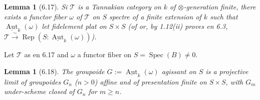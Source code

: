 \documentclass[12pt,a4paper]{article}
\theoremstyle{plain}
\newtheorem{lemma}[theorem]{Lemma}
\theoremstyle{definition}
\DeclareMathOperator{\Spec}{Spec}
\DeclareMathOperator{\Aut}{Aut}
\DeclareMathOperator{\Rep}{Rep}
\begin{document}
\begin{lemma}[6.17]
Si $\mathcal{T}$ is a Tannakian category on $k$ of $\otimes$-generation finite, there exists a functor fiber $\omega$ of $\mathcal{T}$ on $S$ spectre of a finite extension of $k$ such that $\underline{\Aut}_k(\omega)$ let fidelement plat on $S \times S$ (of or, by 1.12(ii) proves en 6.3, $\mathcal{T} \xrightarrow{\sim} \Rep(S : \underline{\Aut}_k(\omega))$).
\end{lemma}

Let $\mathcal{T}$ as en 6.17 and $\omega$ a functor fiber on $S = \Spec(B) \neq 0$.

\begin{lemma}[6.18]
The groupoide $G := \underline{\Aut}_k(\omega)$ agissant on $S$ is a projective limit of groupoides $G_n$ ($n > 0$) affine and of presentation finite on $S \times S$, with $G_m$ under-scheme closed of $G_n$ for $m \geq n$.
\end{lemma}
\end{document}
